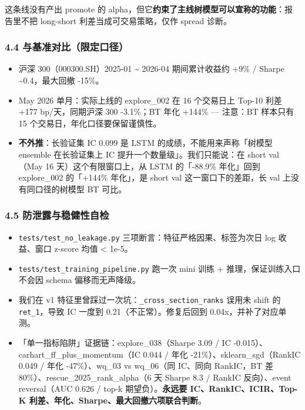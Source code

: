 \documentclass[
  fontset=fandol]{ctexart}
\providecommand{\tightlist}{%
  \setlength{\itemsep}{0pt}\setlength{\parskip}{0pt}}
\begin{document}
这条线没有产出 promote 的
alpha，但它\textbf{约束了主线树模型可以宣称的功能}：报告里不把
long-short 利差当成可交易策略，仅作
spread 诊断。

\hypertarget{ux4e0eux57faux51c6ux5bf9ux6bd4ux9650ux5b9aux53e3ux5f84}{%
\subsubsection{4.4
与基准对比（限定口径）}\label{ux4e0eux57faux51c6ux5bf9ux6bd4ux9650ux5b9aux53e3ux5f84}}

\begin{itemize}
\tightlist
\item
  沪深 300（000300.SH）2025-01
  \textasciitilde{} 2026-04
  期间累计收益约 +9\% / Sharpe
  \textasciitilde0.4，最大回撤 -15\%。
\item
  May 2026 单月：实际上线的 explore\_002
  在 16 个交易日上 Top-10 利差 +177
  bp/天，同期沪深 300 -3.1\%；BT 年化
  +144\% --- 注意：BT 样本只有 15
  个交易日，年化口径要保留谨慎性。
\item
  \textbf{不外推}：长验证集 IC 0.099 是
  LSTM 的成绩，不能用来声称「树模型
  ensemble 在长验证集上 IC
  提升一个数量级」。我们只能说：在 short
  val（May 16 天）这个有限窗口上，从
  LSTM 的「-88.9\% 年化」回到
  explore\_002 的「+144\% 年化」，是
  short val 这一窗口下的差距，长 val
  上没有同口径的树模型 BT 可比。
\end{itemize}

\hypertarget{ux9632ux6cc4ux9732ux4e0eux7a33ux5065ux6027ux81eaux68c0}{%
\subsubsection{4.5
防泄露与稳健性自检}\label{ux9632ux6cc4ux9732ux4e0eux7a33ux5065ux6027ux81eaux68c0}}

\begin{itemize}
\tightlist
\item
  \texttt{tests/test\_no\_leakage.py}
  三项断言：特征严格因果、标签为次日 log
  收益、窗口 z-score 均值 \textless{}
  1e-5。
\item
  \texttt{tests/test\_training\_pipeline.py}
  跑一次 mini 训练 +
  推理，保证训练入口不会因 schema
  偏移而无声降级。
\item
  我们在 v1
  特征里曾踩过一次坑：\texttt{\_cross\_section\_ranks}
  误用未 shift 的 \texttt{ret\_1}，导致
  IC 一度到 0.21（不正常）。修复后回到
  0.04x，并补了对应单测。
\item
  「单一指标陷阱」证据链：explore\_038（Sharpe
  3.09 / IC
  -0.015）、carhart\_ff\_plus\_momentum（IC
  0.044 / 年化
  -21\%）、sklearn\_sgd（RankIC 0.049 /
  年化 -47\%）、wq\_03 vs wq\_06（同
  IC、同向 RankIC，BT 差
  80\%）、rescue\_2025\_rank\_alpha（6
  天 Sharpe 8.3 / RankIC 反向）、event
  reversal（AUC 0.626 / top-k
  期望负）。\textbf{永远要
  IC、RankIC、ICIR、Top-K
  利差、年化、Sharpe、最大回撤六项联合判断}。
\end{itemize}
\end{document}
